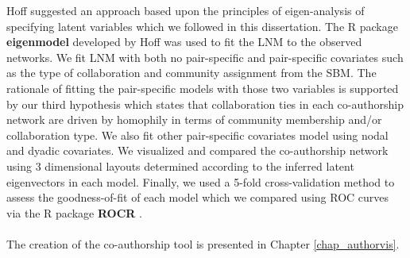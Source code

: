 Hoff \cite{hoff_modeling_2008} suggested an approach based upon the principles of eigen-analysis of specifying latent variables which we followed in this dissertation. The R package \textbf{eigenmodel} developed by Hoff \cite{hoff_eigenmodel:_2012} was used to fit the LNM to the observed networks. We fit LNM with both no pair-specific and pair-specific covariates such as the type of collaboration and community assignment from the SBM. The rationale of fitting the pair-specific models with those two variables is supported by our third hypothesis which states that collaboration ties in each co-authorship network are driven by homophily in terms of community membership and/or collaboration type. We also fit other pair-specific covariates model using nodal and dyadic covariates. We visualized and compared the co-authorship network using 3 dimensional layouts determined according to the inferred latent eigenvectors in each model. Finally, we used a 5-fold cross-validation method to assess the goodness-of-fit of each model which we compared using ROC curves via the R package \textbf{ROCR} \citep{SingROCRvisualizingclassifier2005}.\\
~\\
The creation of the co-authorship tool is presented in Chapter \ref{chap_authorvis}.


